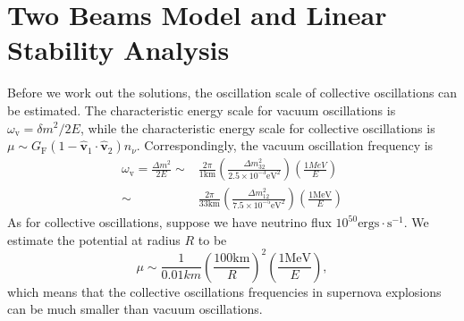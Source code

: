 






\section{\label{chap:collective-sec:two-beams}Two Beams Model and Linear Stability Analysis}

Before we work out the solutions, the oscillation scale of collective oscillations can be estimated. The characteristic energy scale for vacuum oscillations is $\omega_{\mathrm v} = \delta m^2\big/2E $, while the characteristic energy scale for collective oscillations is $\mu \sim G_{\mathrm F} (1- \hat{\boldsymbol{ v} }_1 \cdot \hat{\boldsymbol{v}}_2) n_{\nu} $. Correspondingly, the vacuum oscillation frequency is
\begin{align*}
 \omega_{\mathrm v} = \frac{\Delta m^2}{2E}  \sim& \frac{2\pi}{ 1  \mathrm{km} }  \left(\frac{\Delta m^2_{32}}{2.5\times 10^{-3} \mathrm{eV}^2 } \right) \left( \frac{1MeV}{E} \right) \\
\sim & \frac{2\pi}{ 33  \mathrm{km} } \left( \frac{\Delta m_{12}^2}{7.5\times 10^{-5}\mathrm{eV}^2} \right) \left( \frac{1\mathrm{MeV}}{E} \right)
\end{align*}
As for collective oscillations, suppose we have neutrino flux $10^{50}\mathrm{ergs\cdot s^{-1}}$. We estimate the potential at radius $R$ to be
\begin{equation*}
\mu \sim  \frac{1}{0.01 km} \left(\frac{100\mathrm{km}}{R}\right)^2 \left(\frac{1\mathrm{MeV}}{E}\right),
\end{equation*}
which means that the collective oscillations frequencies in supernova explosions can be much smaller than vacuum oscillations.



